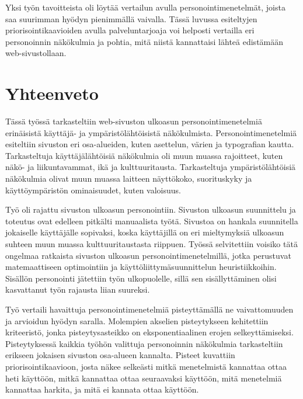 \documentclass[finnish, 12pt, a4paper, elec, utf8, a-1b]{aaltothesis}
\begin{document}
Yksi työn tavoitteista oli löytää vertailun avulla personointimenetelmät, joista
saa suurimman hyödyn pienimmällä vaivalla. Tässä luvussa esiteltyjen
priorisointikaavioiden avulla palveluntarjoaja voi helposti vertailla eri
personoinnin näkökulmia ja pohtia, mitä niistä kannattaisi lähteä edistämään
web-sivustollaan.

\clearpage
\section{Yhteenveto}

Tässä työssä tarkasteltiin web-sivuston ulkoasun personointimenetelmiä
erinäisistä käyttäjä- ja ympäristölähtöisistä näkökulmista.
Personointimenetelmiä esiteltiin sivuston eri osa-alueiden, kuten asettelun,
värien ja typografian kautta. Tarkasteltuja käyttäjälähtöisiä näkökulmia oli
muun muassa rajoitteet, kuten näkö- ja liikuntavammat, ikä ja kulttuuritausta.
Tarkasteltuja ympäristölähtöisiä näkökulmia olivat muun muassa laitteen
näyttökoko, suorituskyky ja käyttöympäristön ominaisuudet, kuten valoisuus.

Työ oli rajattu sivuston ulkoasun personointiin. Sivuston ulkoasun suunnittelu
ja toteutus ovat edelleen pitkälti manuaalista työtä. Sivustoa on hankala
suunnitella jokaiselle käyttäjälle sopivaksi, koska käyttäjillä on eri
mieltymyksiä ulkoasun suhteen muun muassa kulttuuritaustasta riippuen. Työssä
selvitettiin voisiko tätä ongelmaa ratkaista sivuston ulkoasun
personointimenetelmillä, jotka perustuvat matemaattiseen optimointiin ja
käyttöliittymäsuunnittelun heuristiikkoihin. Sisällön personointi jätettiin työn
ulkopuolelle, sillä sen sisällyttäminen olisi kasvattanut työn rajausta liian
suureksi.

Työ vertaili havaittuja personointimenetelmiä pisteyttämällä ne vaivattomuuden
ja arvioidun hyödyn saralla. Molempien akselien pisteytykseen kehitettiin
kriteeristö, jonka pisteytysasteikko on eksponentiaalinen erojen
selkeyttämiseksi. Pisteytyksessä kaikkia työhön valittuja personoinnin
näkökulmia tarkasteltiin erikseen jokaisen sivuston osa-alueen kannalta. Pisteet
kuvattiin priorisointikaavioon, josta näkee selkeästi mitkä menetelmistä
kannattaa ottaa heti käyttöön, mitkä kannattaa ottaa seuraavaksi käyttöön, mitä
menetelmiä kannattaa harkita, ja mitä ei kannata ottaa käyttöön.
\end{document}
